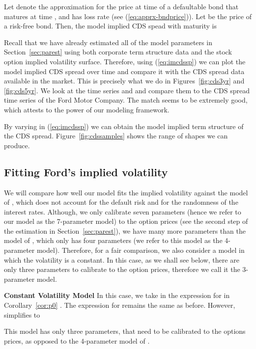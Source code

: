 \documentclass[11pt]{article}
\numberwithin{equation}{section}
\begin{document}
Let  denote the approximation for the
price at time  of a defaultable bond that matures at
time , and has loss rate  (see (\ref{eq:apprx-bndprice})). Let  be the price
of a risk-free bond. Then, the model implied CDS spead with maturity  is

Recall that we have already estimated all of the model parameters in Section~\ref{sec:parest} using both corporate term structure data and the stock option implied volatility surface. Therefore, using  (\ref{eq:imcdssp}) we can plot the model implied CDS spread over time and compare it with the CDS spread data available in the market. This is precisely what we do in Figures~\ref{fig:cds3yr} and \ref{fig:cds5yr}. We look at the time series  and  and compare them to the CDS spread time series of the Ford Motor Company. The match seems to be extremely good, which attests to the power of our modeling framework.

By varying  in (\ref{eq:imcdssp}) we can obtain the model implied term structure of the CDS spread. Figure~\ref{fig:cdssamples} shows the range of shapes we can produce.



\subsection{Fitting Ford's implied volatility}\label{sec:Fordsimplied}

We will compare how well our model fits the implied volatility against the model of \cite{ronnie-timescale}, which does not account for the default risk and for the randomness of the interest rates.
Although, we only calibrate seven parameters (hence we refer to our model as the 7-parameter model) to the option prices (see the second step of the estimation in Section~\ref{sec:parest}), we have many more parameters than the model of \cite{ronnie-timescale}, which only has four parameters (we refer to this model as the 4-parameter model). Therefore, for a fair comparison, we also consider a model in which the volatility is a constant. In this case, as we shall see below, there are only three parameters to calibrate to the option prices, therefore we call it the 3-parameter model.

\noindent \textbf{Constant Volatility Model}
 In this case, we take  in the expression for  in Corollary~\ref{cor:p0} .
The expression for  remains the same as before. However,  simplifies to

This model has only three parameters,  that need to be calibrated to the options prices, as opposed to the 4-parameter model of \cite{ronnie-timescale}.
\end{document}
